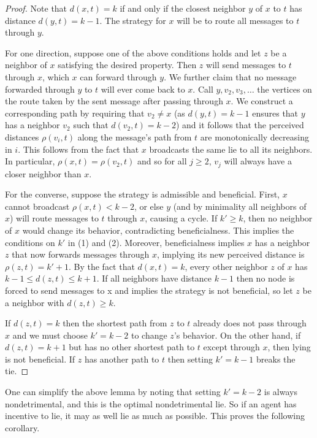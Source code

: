 \documentclass{comnet}
\begin{document}
\begin{proof}

Note that $d(x,t) = k$ if and only if the closest neighbor $y$ of $x$ to $t$
has distance $d(y,t) = k-1$. The strategy for $x$ will be to route all messages
to $t$ through $y$.

For one direction, suppose one of the above conditions holds and let $z$ be a
neighbor of $x$ satisfying the desired property. Then $z$ will send messages to
$t$ through $x$, which $x$ can forward through $y$. We further claim that no
message forwarded through $y$ to $t$ will ever come back to $x$. Call $y, v_2,
v_3, \dots$ the vertices on the route taken by the sent message after passing
through $x$. We construct a corresponding path by requiring that $v_2 \neq x$ (as $d(y,t)=k-1$ 
ensures that $y$ has a neighbor $v_{2}$ such that $d(v_{2},t)=k-2$) 
and it follows that the perceived distances $\rho(v_i, t)$ along the message's path from $t$
are monotonically decreasing in $i$. This follows from the fact that $x$
broadcasts the same lie to all its neighbors. In particular, $\rho(x,t) =
\rho(v_2, t)$ and so for all $j \geq 2$, $v_j$ will always have a closer
neighbor than $x$.

For the converse, suppose the strategy is admissible and beneficial. First, $x$
cannot broadcast $\rho(x,t) < k-2$, or else $y$ (and by minimality all
neighbors of $x$) will route messages to $t$ through $x$, causing a cycle. If
$k' \geq k$, then no neighbor of $x$ would change its behavior, contradicting
beneficialness. This implies the conditions on $k'$ in (1) and (2). Moreover,
beneficialness implies $x$ has a neighbor $z$ that now forwards messages
through $x$, implying its new perceived distance is $\rho(z,t) = k' + 1$. By
the fact that $d(x,t) = k$, every other neighbor $z$ of $x$ has $k-1 \leq
d(z,t) \leq k+1$. If all neighbors have distance $k-1$ then no node is forced to send
messages to x and implies the strategy is not beneficial, so let $z$ be a neighbor
with $d(z,t) \geq k$.

If $d(z,t) = k$ then the shortest path from $z$ to $t$ already does not pass
through $x$ and we must choose $k' = k-2$ to change $z$'s behavior. On the
other hand, if $d(z,t) = k+1$ but has no other shortest path to $t$ except
through $x$, then lying is not beneficial. If $z$ has another
path to $t$ then setting $k' = k-1$ breaks the tie.
\end{proof}

One can simplify the above lemma by noting that setting $k' = k-2$ is always
nondetrimental, and this is the optimal nondetrimental lie. So if an agent has
incentive to lie, it may as well lie as much as possible. This proves the
following corollary.
\end{document}

